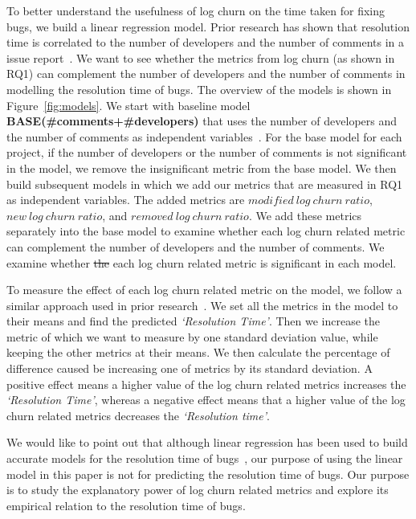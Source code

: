 \documentclass[conference]{IEEEtran}
\providecommand{\DIFdel}[1]{{\protect\color{red}\sout{#1}}}                      %
\providecommand{\DIFdelbegin}{} %
\providecommand{\DIFdelend}{} %
\begin{document}
To better understand the usefulness of log churn on the time taken for fixing bugs, we build a linear regression model. Prior research has shown that resolution time is correlated to the number of developers and the number of comments in a issue report~\cite{RTpredictions}. We want to see whether the metrics from log churn (as shown in RQ1) can complement the number of developers and the number of comments in modelling the resolution time of bugs. The overview of the models is shown in Figure~\ref{fig:models}. We start with baseline model \textbf{BASE(\#comments+\#developers)} that uses the number of developers and the number of comments as independent variables~\cite{RTpredictions}. For the base model for each project, if the number of developers or the number of comments is not significant in the model, we remove the insignificant metric from the base model. We then build subsequent models in which we add our metrics that are measured in RQ1 as independent variables. The added metrics are $modified\ log\ churn\ ratio$, $new\ log\ churn\ ratio$, and $removed\ log\ churn\ ratio$. We add these metrics separately into the base model to examine whether each log churn related metric can complement the number of developers and the number of comments. We examine whether \DIFdelbegin \DIFdel{the }\DIFdelend each log churn related metric is significant in each model.

To measure the effect of each log churn related metric on the model, we follow a similar approach used in prior research~\cite{shihab,mocku}. We set all the metrics in the model to their means and find the predicted {\em`Resolution Time'}. Then we increase the metric of which we want to measure by one standard deviation value, while keeping the other metrics at their means. We then calculate the percentage of difference caused be increasing one of metrics by its standard deviation. A positive effect means a higher value of the log churn related metrics increases the {\em`Resolution Time'}, whereas a negative effect means that a higher value of the log churn related metrics  decreases the {\em`Resolution time'}.

We would like to point out that although linear regression has been used to build accurate models for the resolution time of bugs~\cite{RTpredictions}, our purpose of using the linear model in this paper is not for predicting the resolution time of bugs. Our purpose is to study the explanatory power of log churn related metrics and explore its empirical relation to the resolution time of bugs.%
\end{document}
